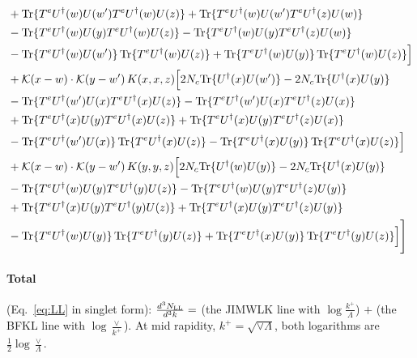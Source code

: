 \documentclass[10pt]{article}
\numberwithin{equation}{section}
\begin{document}
\begin{align}
&+{\rm Tr}\{T^eU^\dagger(w)U(w')T^eU^\dagger(w)U(z)\}+{\rm Tr}\{T^eU^\dagger(w)U(w')T^eU^\dagger(z)U(w)\}\notag\\
&-{\rm Tr}\{T^eU^\dagger(w)U(y)T^eU^\dagger(w)U(z)\}-{\rm Tr}\{T^eU^\dagger(w)U(y)T^eU^\dagger(z)U(w)\}\notag\\
&-{\rm Tr}\{T^eU^\dagger(w)U(w')\}\,{\rm Tr}\{T^eU^\dagger(w)U(z)\}+{\rm Tr}\{T^eU^\dagger(w)U(y)\}\,{\rm Tr}\{T^eU^\dagger(w)U(z)\}\Big]\notag\\
&+\mathcal K(x-w)\cdot\mathcal K(y-w')\,K(x,x,z)\Big[2 N_{c}{\rm Tr}\{U^\dagger(x)U(w')\}-2 N_{c}{\rm Tr}\{U^\dagger(x)U(y)\}\notag\\
&-{\rm Tr}\{T^eU^\dagger(w')U(x)T^eU^\dagger(x)U(z)\}-{\rm Tr}\{T^eU^\dagger(w')U(x)T^eU^\dagger(z)U(x)\}\notag\\
&+{\rm Tr}\{T^eU^\dagger(x)U(y)T^eU^\dagger(x)U(z)\}+{\rm Tr}\{T^eU^\dagger(x)U(y)T^eU^\dagger(z)U(x)\}\notag\\
&-{\rm Tr}\{T^eU^\dagger(w')U(x)\}\,{\rm Tr}\{T^eU^\dagger(x)U(z)\}-{\rm Tr}\{T^eU^\dagger(x)U(y)\}\,{\rm Tr}\{T^eU^\dagger(x)U(z)\}\Big]\notag\\
&+\mathcal K(x-w)\cdot\mathcal K(y-w')\,K(y,y,z)\Big[2 N_{c}{\rm Tr}\{U^\dagger(w)U(y)\}-2 N_{c}{\rm Tr}\{U^\dagger(x)U(y)\}\notag\\
&-{\rm Tr}\{T^eU^\dagger(w)U(y)T^eU^\dagger(y)U(z)\}-{\rm Tr}\{T^eU^\dagger(w)U(y)T^eU^\dagger(z)U(y)\}\notag\\
&+{\rm Tr}\{T^eU^\dagger(x)U(y)T^eU^\dagger(y)U(z)\}+{\rm Tr}\{T^eU^\dagger(x)U(y)T^eU^\dagger(z)U(y)\}\notag\\
&-{\rm Tr}\{T^eU^\dagger(w)U(y)\}\,{\rm Tr}\{T^eU^\dagger(y)U(z)\}+{\rm Tr}\{T^eU^\dagger(x)U(y)\}\,{\rm Tr}\{T^eU^\dagger(y)U(z)\}\Big]\Bigg]
\end{align}
\paragraph{Total} (Eq.~\eqref{eq:LL} in singlet form): $\frac{d^3N_{\rm LL}}{d^3k}=$ (the JIMWLK line with $\log\frac{k^+}{\Lambda}$) $+$ (the BFKL line with $\log\frac{\vee}{k^+}$). At mid rapidity, $k^+=\sqrt{\vee\Lambda}$, both logarithms are $\frac12\log\frac{\vee}{\Lambda}$.

\end{document}
